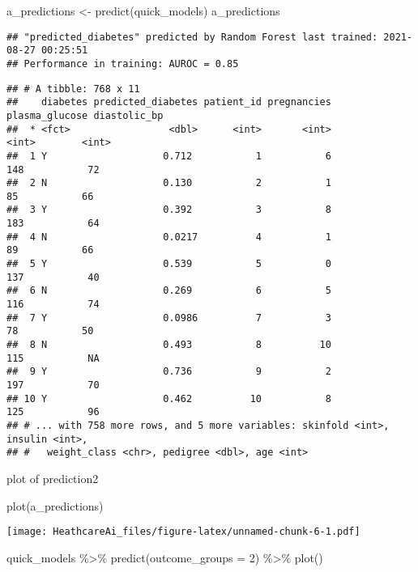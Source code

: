 \documentclass[
]{article}
\newenvironment{Shaded}{\begin{snugshade}}{\end{snugshade}}
\newcommand{\AttributeTok}[1]{\textcolor[rgb]{0.77,0.63,0.00}{#1}}
\newcommand{\DecValTok}[1]{\textcolor[rgb]{0.00,0.00,0.81}{#1}}
\newcommand{\FunctionTok}[1]{\textcolor[rgb]{0.00,0.00,0.00}{#1}}
\newcommand{\NormalTok}[1]{#1}
\newcommand{\OtherTok}[1]{\textcolor[rgb]{0.56,0.35,0.01}{#1}}
\newcommand{\SpecialCharTok}[1]{\textcolor[rgb]{0.00,0.00,0.00}{#1}}
\begin{document}
\begin{Shaded}
\begin{Highlighting}[]
\NormalTok{a\_predictions }\OtherTok{\textless{}{-}} \FunctionTok{predict}\NormalTok{(quick\_models)}
\NormalTok{a\_predictions}
\end{Highlighting}
\end{Shaded}

\begin{verbatim}
## "predicted_diabetes" predicted by Random Forest last trained: 2021-08-27 00:25:51
## Performance in training: AUROC = 0.85
\end{verbatim}

\begin{verbatim}
## # A tibble: 768 x 11
##    diabetes predicted_diabetes patient_id pregnancies plasma_glucose diastolic_bp
##  * <fct>                 <dbl>      <int>       <int>          <int>        <int>
##  1 Y                    0.712           1           6            148           72
##  2 N                    0.130           2           1             85           66
##  3 Y                    0.392           3           8            183           64
##  4 N                    0.0217          4           1             89           66
##  5 Y                    0.539           5           0            137           40
##  6 N                    0.269           6           5            116           74
##  7 Y                    0.0986          7           3             78           50
##  8 N                    0.493           8          10            115           NA
##  9 Y                    0.736           9           2            197           70
## 10 Y                    0.462          10           8            125           96
## # ... with 758 more rows, and 5 more variables: skinfold <int>, insulin <int>,
## #   weight_class <chr>, pedigree <dbl>, age <int>
\end{verbatim}

plot of prediction2

\begin{Shaded}
\begin{Highlighting}[]
\FunctionTok{plot}\NormalTok{(a\_predictions)}
\end{Highlighting}
\end{Shaded}

\texttt{[image: HeathcareAi\_files/figure-latex/unnamed-chunk-6-1.pdf]}

\begin{Shaded}
\begin{Highlighting}[]
\NormalTok{quick\_models }\SpecialCharTok{\%\textgreater{}\%}
  \FunctionTok{predict}\NormalTok{(}\AttributeTok{outcome\_groups =} \DecValTok{2}\NormalTok{) }\SpecialCharTok{\%\textgreater{}\%}
  \FunctionTok{plot}\NormalTok{()}
\end{Highlighting}
\end{Shaded}
\end{document}
